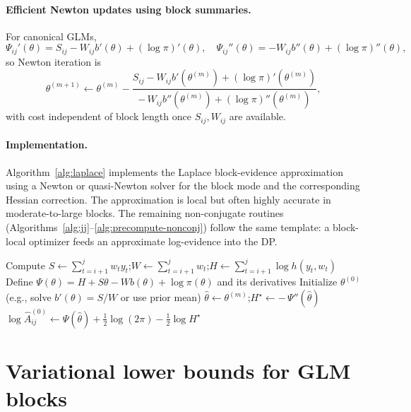 \paragraph{Efficient Newton updates using block summaries.}
For canonical GLMs,
\[
\Psi_{ij}'(\theta) = S_{ij} - W_{ij} b'(\theta) + (\log\pi)'(\theta),\quad
\Psi_{ij}''(\theta) = -W_{ij} b''(\theta) + (\log\pi)''(\theta),
\]
so Newton iteration is
\[
\theta^{(m+1)} \leftarrow \theta^{(m)}
 - \frac{S_{ij} - W_{ij} b'(\theta^{(m)}) + (\log\pi)'(\theta^{(m)})}
        {-\,W_{ij} b''(\theta^{(m)}) + (\log\pi)''(\theta^{(m)})},
\]
with cost independent of block length once $S_{ij},W_{ij}$ are available.

\paragraph{Implementation.}
Algorithm~\ref{alg:laplace} implements the Laplace block-evidence approximation using a Newton
or quasi-Newton solver for the block mode and the corresponding Hessian correction. The
approximation is local but often highly accurate in moderate-to-large blocks. The remaining
non-conjugate routines (Algorithms~\ref{alg:jj}--\ref{alg:precompute-nonconj}) follow the same
template: a block-local optimizer feeds an approximate log-evidence into the DP.

\begin{algorithm}[H]
\caption{GLMBlock\_Laplace$(y,w,i,j,\texttt{b},\texttt{prior})$}
\label{alg:laplace}
Compute $S\leftarrow \sum_{t=i+1}^j w_t y_t$;\quad $W\leftarrow \sum_{t=i+1}^j w_t$;\quad $H\leftarrow \sum_{t=i+1}^j \log h(y_t,w_t)$\;
Define $\Psi(\theta)=H + S\theta - W b(\theta) + \log \pi(\theta)$ and its derivatives\;
Initialize $\theta^{(0)}$ (e.g., solve $b'(\theta)=S/W$ or use prior mean)\;
$\hat\theta\leftarrow \theta^{(m)}$;\quad $H^\star\leftarrow -\,\Psi''(\hat\theta)$\;
$\log \widehat{A}^{(0)}_{ij}\leftarrow \Psi(\hat\theta) + \tfrac{1}{2}\log(2\pi) - \tfrac{1}{2}\log H^\star$\;
\end{algorithm}

\section{Variational lower bounds for GLM blocks}

